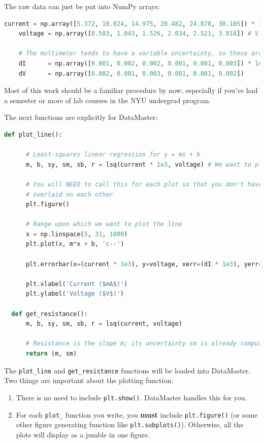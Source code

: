 \documentclass[12pt]{article}
\begin{document}
{The raw data can just be put into NumPy arrays:
\begin{framed}
  \begin{lstlisting}[language=Python]
    current = np.array([5.372, 10.024, 14.975, 20.482, 24.878, 30.105]) * 1e-3 # mA
    voltage = np.array([0.503, 1.043, 1.526, 2.034, 2.521, 3.018]) # V

    # The multimeter tends to have a variable uncertainty, so these arrays is needed
    dI      = np.array([0.001, 0.002, 0.002, 0.001, 0.001, 0.003]) * 1e-3
    dV      = np.array([0.002, 0.001, 0.003, 0.001, 0.001, 0.002])
  \end{lstlisting}
\end{framed}
Most of this work should be a familiar procedure by now, especially if you've had a semester or more of lab courses in the NYU undergrad program.

The next functions are explicitly for DataMaster:
\begin{framed}
  \begin{lstlisting}[language=Python]
    def plot_line():

      # Least-squares linear regression for y = mx + b
      m, b, sy, sm, sb, r = lsq(current * 1e3, voltage) # We want to plot in mA

      # You will NEED to call this for each plot so that you don't have multiple plots
      # overlaid on each other
      plt.figure()

      # Range upon which we want to plot the line
      x = np.linspace(5, 31, 1000)
      plt.plot(x, m*x + b, 'c--')

      plt.errorbar(x=(current * 1e3), y=voltage, xerr=(dI * 1e3), yerr=dV, fmt='r.', ecolor='k', alpha=0.5)

      plt.xlabel('Current ($mA$)')
      plt.ylabel('Voltage ($V$)')

  def get_resistance():
      m, b, sy, sm, sb, r = lsq(current, voltage)

      # Resistance is the slope m; its uncertainty sm is already computed by lsq()
      return (m, sm)
  \end{lstlisting}
\end{framed}

The \texttt{plot\_line} and \texttt{get\_resistance} functions will be loaded into DataMaster. Two things are important about the plotting function:
\begin{enumerate}
  \item There is no need to include \texttt{plt.show()}. DataMaster handles this for you.
  \item For each \texttt{plot\_} function you write, you \textbf{must} include \texttt{plt.figure()} (or some other figure generating function like \texttt{plt.subplots()}). Otherwise, all the plots will display as a jumble in one figure.
\end{enumerate}

}
\end{document}
